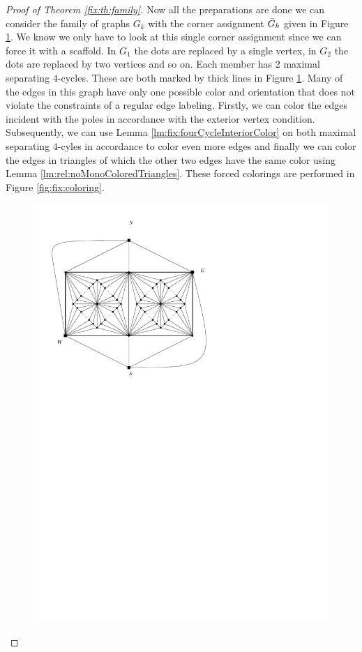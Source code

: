 \begin{proof}[Proof of Theorem \ref{fix:th:family}]
  Now all the preparations are done we can consider the family of graphs $G_k$ with the corner assignment $\bar{G}_k$ given in Figure \ref{fig:fix:manymany0}. We know we only have to look at this single corner assignment since we can force it with a scaffold. In $G_1$ the dots are replaced by a single vertex, in $G_2$ the dots are replaced by two vertices and so on. Each member has 2 maximal separating $4$-cycles. These are both marked by thick lines in Figure \ref{fig:fix:manymany0}.
  Many of the edges in this graph have only one possible color and orientation that does not violate the constraints of a regular edge labeling. Firstly, we can color the edges incident with the poles in accordance with the exterior vertex condition. Subsequently, we can use Lemma \ref{lm:fix:fourCycleInteriorColor} on both maximal separating $4$-cyles in accordance to color even more edges and finally we can color the edges in triangles of which the other two edges have  the same color using Lemma \ref{lm:rel:noMonoColoredTriangles}. These forced colorings are performed in Figure \ref{fig:fix:coloring}.

  \begin{figure}[h]
    \centering
    \includegraphics[scale=1]{fixExtension/img/manymanybase}
    \caption{}
    \label{fig:fix:manymany0}
  \end{figure}





\end{proof}
